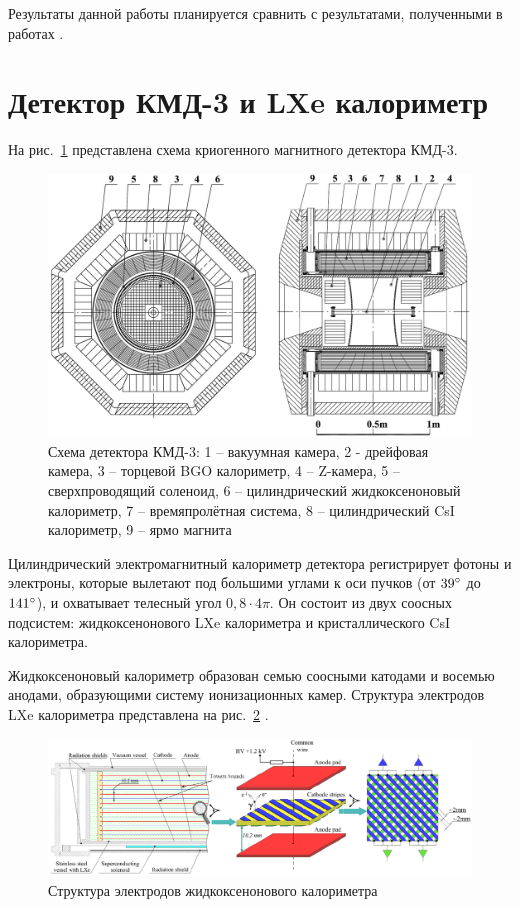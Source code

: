\documentclass[14pt]{extarticle}
\begin{document}
Результаты данной работы планируется сравнить с результатами, полученными в работах \cite{lakomov,rabusov}.
\section{Детектор КМД-3 и LXe калориметр}
На рис.~\ref{fig:cmd3} представлена схема криогенного магнитного детектора КМД-3.
\begin{figure}[h!]
	\includegraphics[width=\linewidth]{../pics/cmd3-2.png}
	\caption{Схема детектора КМД-3: 1 -- вакуумная камера, 2 - дрейфовая камера, 3 -- торцевой BGO калориметр, 4 -- Z-камера, 5 -- сверхпроводящий соленоид, 6 -- цилиндрический жидкоксеноновый калориметр, 7 -- времяпролётная система, 8 -- цилиндрический CsI калориметр, 9 -- ярмо магнита \cite{shebalin}}
	\label{fig:cmd3}
\end{figure}

Цилиндрический электромагнитный калориметр детектора регистрирует фотоны и электроны, которые вылетают под большими углами к оси пучков (от $39\degree$ до $141\degree$), и охватывает телесный угол $0,8 \cdot 4\pi$. Он состоит из двух соосных подсистем: жидкоксенонового LXe калориметра и кристаллического CsI калориметра.

Жидкоксеноновый калориметр образован семью соосными катодами и восемью анодами, образующими систему ионизационных камер. Структура электродов LXe калориметра представлена на рис.~\ref{fig:lxe-electrodes} \cite{shebalin}.

\begin{figure}[h!]
	\includegraphics[width=\linewidth]{../pics/lxe-electrodes.png}
	\caption{Структура электродов жидкоксенонового калориметра}
	\label{fig:lxe-electrodes}
\end{figure}
\end{document}
